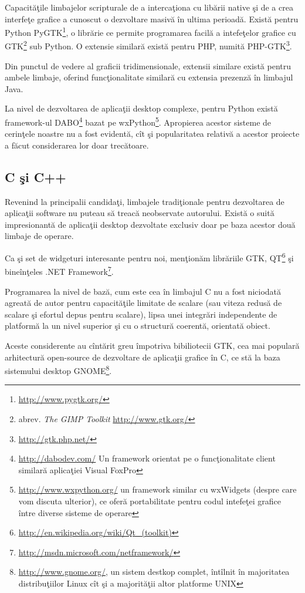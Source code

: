 Capacităţile limbajelor scripturale de a intercaţiona cu libării native şi de a 
crea interfeţe grafice a cunoscut o dezvoltare masivă în ultima perioadă. 
Există pentru Python PyGTK\footnote{\url{http://www.pygtk.org/}}, o librărie ce 
permite programarea facilă a intefeţelor grafice cu GTK\footnote{abrev. 
\textit{The GIMP Toolkit} \url{http://www.gtk.org/}} sub Python. O extensie 
similară există pentru PHP, numită PHP-GTK\footnote{\url{http://gtk.php.net/}}.

Din punctul de vedere al graficii tridimensionale, extensii similare există 
pentru ambele limbaje, oferind funcţionalitate similară cu extensia prezenză în 
limbajul Java.

La nivel de dezvoltarea de aplicaţii desktop complexe, pentru Python există 
framework-ul DABO\footnote{\url{http://dabodev.com/} Un framework orientat pe o 
funcţionalitate client similară aplicaţiei Visual FoxPro} bazat pe 
wxPython\footnote{\url{http://www.wxpython.org/} un framework similar cu 
wxWidgets (despre care vom discuta ulterior), ce oferă portabilitate pentru 
codul intefeţei grafice între diverse sisteme de operare}. Apropierea acestor 
sisteme de cerinţele noastre nu a fost evidentă, cît şi popularitatea relativă 
a acestor proiecte a făcut considerarea lor doar trecătoare.

\subsection{C şi C++}

Revenind la principalii candidaţi, limbajele tradiţionale pentru dezvoltarea de 
aplicaţii software nu puteau să treacă neobservate autorului. Există o suită 
impresionantă de aplicaţii desktop dezvoltate exclusiv doar pe baza acestor 
două limbaje de operare.

Ca şi set de widgeturi interesante pentru noi, menţionăm librăriile GTK, 
QT\footnote{\url{http://en.wikipedia.org/wiki/Qt_(toolkit)}} şi bineînţeles 
.NET Framework\footnote{\url{http://msdn.microsoft.com/netframework/}}.

Programarea la nivel de bază, cum este cea în limbajul C nu a fost niciodată 
agreată de autor pentru capacităţile limitate de scalare (sau viteza redusă de 
scalare şi efortul depus pentru scalare), lipsa unei integrări independente de 
platformă la un nivel superior şi cu o structură coerentă, orientată obiect.

Aceste considerente au cîntărit greu împotriva bibiliotecii GTK, cea mai 
populară arhitectură open-source de dezvoltare de aplicaţii grafice în C, ce 
stă la baza sistemului desktop GNOME\footnote{\url{http://www.gnome.org/}, un 
sistem destkop complet, întîlnit în majoritatea distribuţiilor Linux cît şi a 
majorităţii altor platforme UNIX}.

